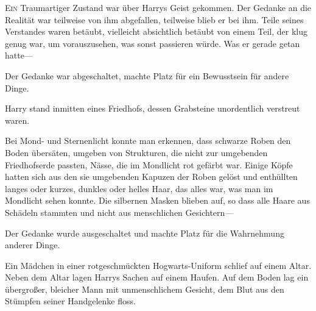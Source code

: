 
\lettrine{E}{in} Traumartiger Zustand war über Harrys Geist gekommen. Der Gedanke an die Realität war teilweise von ihm abgefallen, teilweise blieb er bei ihm. Teile seines Verstandes waren betäubt, vielleicht absichtlich betäubt von einem Teil, der klug genug war, um vorauszusehen, was sonst passieren würde.
Was er gerade getan hatte—

Der Gedanke war abgeschaltet, machte Platz für ein Bewusstsein für andere Dinge.

Harry stand inmitten eines Friedhofs, dessen Grabsteine unordentlich verstreut waren.

Bei Mond- und Sternenlicht konnte man erkennen, dass schwarze Roben den Boden übersäten, umgeben von Strukturen, die nicht zur umgebenden Friedhofserde passten, Nässe, die im Mondlicht rot gefärbt war. Einige Köpfe hatten sich aus den sie umgebenden Kapuzen der Roben gelöst und enthüllten langes oder kurzes, dunkles oder helles Haar, das alles war, was man im Mondlicht sehen konnte. Die silbernen Masken blieben auf, so dass alle Haare aus Schädeln stammten und nicht aus menschlichen Gesichtern—

Der Gedanke wurde ausgeschaltet und machte Platz für die Wahrnehmung anderer Dinge.

Ein Mädchen in einer rotgeschmückten Hogwarts-Uniform schlief auf einem Altar.
Neben dem Altar lagen Harrys Sachen auf einem Haufen.
Auf dem Boden lag ein übergroßer, bleicher Mann mit unmenschlichem Gesicht, dem Blut aus den Stümpfen seiner Handgelenke floss.

